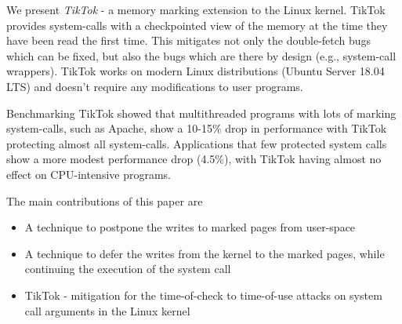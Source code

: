 
We present \emph{TikTok} - a memory marking extension to the Linux kernel. TikTok
provides system-calls with a checkpointed view of the memory at the time they
have been read the first time. This mitigates not only the double-fetch bugs
which can be fixed, but also the bugs which are there by design (e.g., system-call
wrappers). TikTok works on modern Linux distributions (Ubuntu Server 18.04 LTS)
and doesn't require any modifications to user programs.

Benchmarking TikTok showed that multithreaded programs with lots of marking
system-calls, such as Apache, show a 10-15\% drop in performance with TikTok
protecting almost all system-calls. Applications that few protected system calls
show a more modest performance drop (4.5\%), with TikTok having almost no effect
on CPU-intensive programs.


The main contributions of this paper are
\begin{itemize}
\item A technique to postpone the writes to marked pages from user-space
\item A technique to defer the writes from the kernel to the marked pages,
      while continuing the execution of the system call
\item TikTok - mitigation for the time-of-check to time-of-use attacks on system 
      call arguments in the Linux kernel
\end{itemize}



